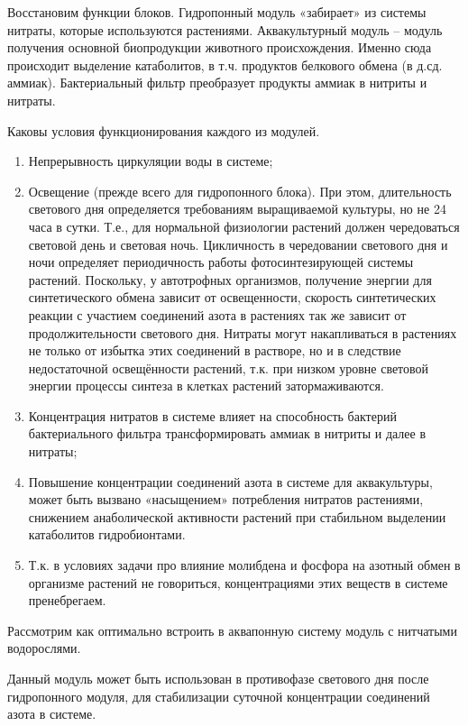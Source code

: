 Восстановим функции блоков. Гидропонный модуль «забирает» из системы нитраты, которые используются растениями. Аквакультурный модуль – модуль получения основной биопродукции животного происхождения. Именно сюда происходит выделение катаболитов, в т.ч. продуктов белкового обмена (в д.сд. аммиак). Бактериальный фильтр преобразует продукты аммиак в нитриты и нитраты.

Каковы условия функционирования каждого из модулей. 
\begin{enumerate}
    \item Непрерывность циркуляции воды в системе; 
    \item Освещение (прежде всего для гидропонного блока). При этом, длительность светового дня определяется требованиям выращиваемой культуры, но не 24 часа в сутки. Т.е., для нормальной физиологии растений должен чередоваться световой день и световая ночь. Цикличность в чередовании светового дня и ночи определяет периодичность работы фотосинтезирующей системы растений. Поскольку, у автотрофных организмов, получение энергии для синтетического обмена зависит от освещенности,  скорость синтетических реакции с участием соединений азота в растениях так же зависит от продолжительности светового дня. 
Нитраты могут накапливаться в растениях не только от избытка этих соединений в растворе, но и в следствие недостаточной освещённости растений, т.к. при низком уровне световой энергии процессы синтеза в клетках растений затормаживаются. 
    \item Концентрация нитратов в системе влияет на способность бактерий бактериального фильтра трансформировать аммиак в нитриты и далее в нитраты; 
    \item Повышение концентрации соединений азота в системе для аквакультуры, может быть вызвано «насыщением» потребления нитратов  растениями, снижением анаболической активности растений при стабильном выделении катаболитов гидробионтами.
    \item Т.к. в условиях задачи про влияние молибдена и фосфора на азотный обмен в организме растений не говориться, концентрациями этих веществ в системе пренебрегаем. 
\end{enumerate}

Рассмотрим как оптимально встроить в аквапонную систему модуль с нитчатыми водорослями.

Данный модуль может быть использован в противофазе светового дня после гидропонного модуля, для стабилизации суточной концентрации соединений азота в системе. 

